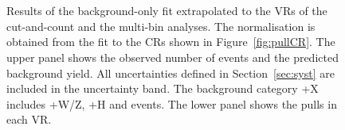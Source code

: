 \begin{figure}[htbp]
	\centering
	\\
	\\
	\caption{Results of the background-only fit extrapolated to the VRs of  the cut-and-count and 
		the multi-bin analyses. The \ttbar normalisation 
		is obtained from the fit to the CRs shown in Figure~\ref{fig:pullCR}. The upper panel shows 
		the observed number of events and the predicted background yield.
		All uncertainties  defined in Section~\ref{sec:syst} are included in the 
		uncertainty band. The background category \ttbar+X includes \ttbar+W/Z, 
		\ttbar+H and \ttbar\ttbar events. The lower panel shows the pulls in 
		each VR. 
	} 
	\label{fig:pullVR}
\end{figure}


